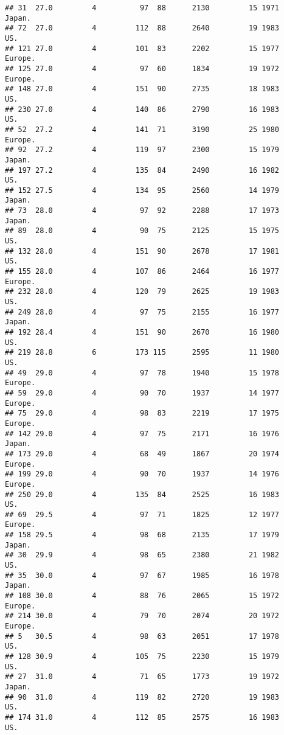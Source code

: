 \documentclass[11pt,]{article}
\begin{document}
\begin{verbatim}
## 31  27.0         4          97  88      2130         15 1971   Japan.
## 72  27.0         4         112  88      2640         19 1983      US.
## 121 27.0         4         101  83      2202         15 1977  Europe.
## 125 27.0         4          97  60      1834         19 1972  Europe.
## 148 27.0         4         151  90      2735         18 1983      US.
## 230 27.0         4         140  86      2790         16 1983      US.
## 52  27.2         4         141  71      3190         25 1980  Europe.
## 92  27.2         4         119  97      2300         15 1979   Japan.
## 197 27.2         4         135  84      2490         16 1982      US.
## 152 27.5         4         134  95      2560         14 1979   Japan.
## 73  28.0         4          97  92      2288         17 1973   Japan.
## 89  28.0         4          90  75      2125         15 1975      US.
## 132 28.0         4         151  90      2678         17 1981      US.
## 155 28.0         4         107  86      2464         16 1977  Europe.
## 232 28.0         4         120  79      2625         19 1983      US.
## 249 28.0         4          97  75      2155         16 1977   Japan.
## 192 28.4         4         151  90      2670         16 1980      US.
## 219 28.8         6         173 115      2595         11 1980      US.
## 49  29.0         4          97  78      1940         15 1978  Europe.
## 59  29.0         4          90  70      1937         14 1977  Europe.
## 75  29.0         4          98  83      2219         17 1975  Europe.
## 142 29.0         4          97  75      2171         16 1976   Japan.
## 173 29.0         4          68  49      1867         20 1974  Europe.
## 199 29.0         4          90  70      1937         14 1976  Europe.
## 250 29.0         4         135  84      2525         16 1983      US.
## 69  29.5         4          97  71      1825         12 1977  Europe.
## 158 29.5         4          98  68      2135         17 1979   Japan.
## 30  29.9         4          98  65      2380         21 1982      US.
## 35  30.0         4          97  67      1985         16 1978   Japan.
## 108 30.0         4          88  76      2065         15 1972  Europe.
## 214 30.0         4          79  70      2074         20 1972  Europe.
## 5   30.5         4          98  63      2051         17 1978      US.
## 128 30.9         4         105  75      2230         15 1979      US.
## 27  31.0         4          71  65      1773         19 1972   Japan.
## 90  31.0         4         119  82      2720         19 1983      US.
## 174 31.0         4         112  85      2575         16 1983      US.

\end{verbatim}
\end{document}
